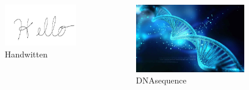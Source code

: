 \documentclass{beamer}
\begin{document}
\begin{frame}
\begin{columns}
\begin{column}{.3\textwidth}

\end{column}


\begin{column}{.3\textwidth}
\begin{figure}
\includegraphics[width=\textwidth]{hand.jpg}
\caption {Handwitten}
\end{figure}
\end{column}
\begin{column}{.3\textwidth}
\begin{figure}
\includegraphics[width=\textwidth]{dna.jpg}
\caption {DNAsequence}
\end{figure}
\end{column}
\end{columns}


\end{frame}
\end{document}
